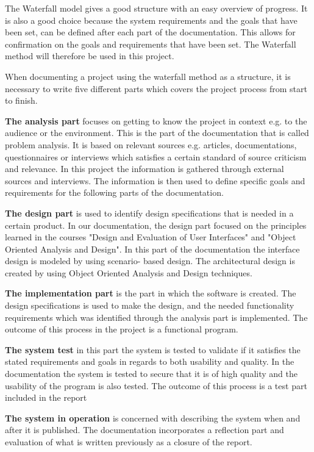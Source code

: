 The Waterfall model gives a good structure with an easy overview of progress. It is also a good choice because the system requirements and the goals that have been set, can be defined after each part of the documentation. This allows for confirmation on the goals and requirements that have been set. The Waterfall method will therefore be used in this project.       

When documenting a project using the waterfall method as a structure, it is necessary to write five different parts which covers the project process from start to finish.

\textbf{The analysis part} focuses on getting to know the project in context e.g. to the audience or the environment. This is the part of the documentation that is called problem analysis. It is based on relevant sources e.g. articles, documentations, questionnaires or interviews which satisfies a certain standard of source criticism and relevance. In this project the information is gathered through external sources and interviews. The information is then used to define specific goals and requirements for the following parts of the documentation.

\textbf{The design part} is used to identify design specifications that is needed in a certain product. In our documentation, the design part focused on the principles learned in the courses "Design and Evaluation of User Interfaces" and "Object Oriented Analysis and Design". In this part of the documentation the interface design is modeled by using scenario- based design. The architectural design is created by using Object Oriented Analysis and Design techniques. 

\textbf{The implementation part} is the part in which the software is created. The design specifications is used to make the design, and the needed functionality requirements which was identified through the analysis part is implemented. The outcome of this process in the project is a functional program.

\textbf{The system test} in this part the system is tested to validate if it satisfies the stated requirements and goals in regards to both usability and quality. In the documentation the system is tested to secure that it is of high quality and the usability of the program is also tested. The outcome of this process is a test part included in the report

\textbf{The system in operation} is concerned with describing the system when and after it is published. The documentation incorporates a reflection part and evaluation of what is written previously as a closure of the report.